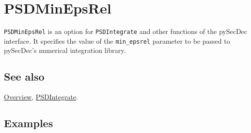 \documentclass[../FeynHelpersManual.tex]{subfiles}
\begin{document}
\hypertarget{psdminepsrel}{
\section{PSDMinEpsRel}\label{psdminepsrel}}

\texttt{PSDMinEpsRel} is an option for \texttt{PSDIntegrate} and other
functions of the pySecDec interface. It specifies the value of the
\texttt{min_epsrel} parameter to be passed to pySecDec's numerical
integration library.

\subsection{See also}

\hyperlink{toc}{Overview}, \hyperlink{psdintegrate}{PSDIntegrate}.

\subsection{Examples}
\end{document}
